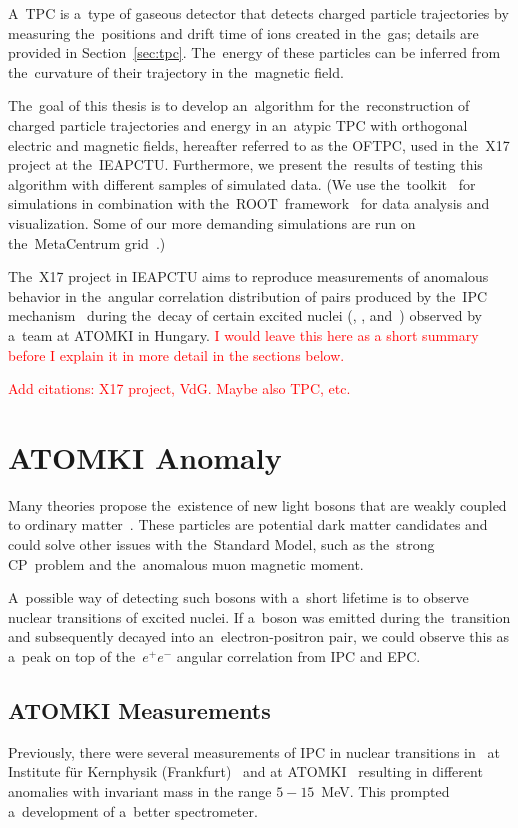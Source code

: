 	A~\ac{TPC} is a~type of gaseous detector that detects charged particle trajectories by measuring the~positions and drift time of ions created in the~gas; details are provided in Section~\ref{sec:tpc}. The~energy of these particles can be inferred from the~curvature of their trajectory in the~magnetic field.
	
	The~goal of this thesis is to develop an~algorithm for the~reconstruction of charged particle trajectories and energy in an~atypic \ac{TPC} with orthogonal electric and magnetic fields, hereafter referred to as the \ac{OFTPC}, used in the~X17 project at the~\ac{IEAPCTU}. Furthermore, we present the~results of testing this algorithm with different samples of simulated data. (We use the~\garfieldpp toolkit~\cite{Garfield++} for simulations in combination with the~ROOT~framework~\cite{ROOT} for data analysis and visualization. Some of our more demanding simulations are run on the~MetaCentrum grid~\cite{metacentrum}.)
	
	The~X17 project in \ac{IEAPCTU} aims to reproduce measurements of anomalous behavior in the~angular correlation distribution of pairs produced by the~\ac{IPC} mechanism~\cite{IPC} during the~decay of certain excited nuclei (, , and~) observed by a~team at ATOMKI in Hungary. \textcolor{red}{I would leave this here as a short summary before I explain it in more detail in the sections below.}
	
	\textcolor{red}{Add citations: X17 project, VdG. Maybe also TPC, etc.}
	
	\section{ATOMKI Anomaly}
	\label{sec:ATOMKI}
		Many theories propose the~existence of new light bosons that are weakly coupled to ordinary matter~\cite{dark}. These particles are potential dark matter candidates and could solve other issues with the~Standard Model, such as the~strong CP~problem and the~anomalous muon magnetic moment.
		
		A~possible way of detecting such bosons with a~short lifetime is to observe nuclear transitions of excited nuclei. If a~boson was emitted during the~transition and subsequently decayed into an~electron\nobreakdash-positron pair, we could observe this as a~peak on top of the~\(e^+e^-\) angular correlation from \ac{IPC} and \ac{EPC}.
	
		\subsection{ATOMKI Measurements}
			Previously, there were several measurements of \ac{IPC} in nuclear transitions in~ at Institute für Kernphysik (Frankfurt)~\cite{ikf1996,ikf1997,ikf2001} and at ATOMKI~\cite{atomki2008,atomki2012} resulting in different anomalies with invariant mass in the range \(5-15\)~MeV. This prompted a~development of a~better spectrometer.
		
